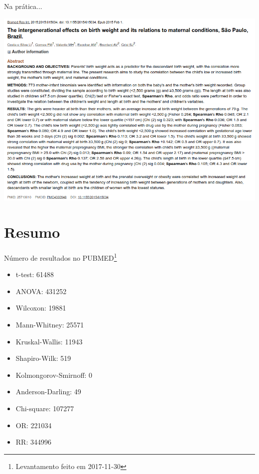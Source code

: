 \documentclass{beamer}
\begin{document}
\begin{frame}{\scriptsize Na prática...}
  \begin{center}
    \includegraphics[width=\textwidth]{Cap37-38/exemplo-spearman-rho}
  \end{center}
\end{frame}

\section{Resumo}

\begin{frame}{\scriptsize Número de resultados no PUBMED\footnote{\tiny Levantamento feito em 2017-11-30}}
  \begin{itemize}
    \scriptsize
  \item t-test: 61488
    \smallskip
  \item ANOVA: 431252
    \smallskip
  \item Wilcoxon: 19881
    \smallskip
  \item Mann-Whitney: 25571
    \smallskip
  \item Kruskal-Wallis: 11943
    \smallskip
  \item Shapiro-Wilk: 519
    \smallskip
  \item Kolmongorov-Smirnoff: 0
    \smallskip
  \item Anderson-Darling: 49
    \smallskip
  \item Chi-square: 107277
    \smallskip
  \item OR: 221034
    \smallskip
  \item RR: 344996
  \end{itemize}
\end{frame}
\end{document}

